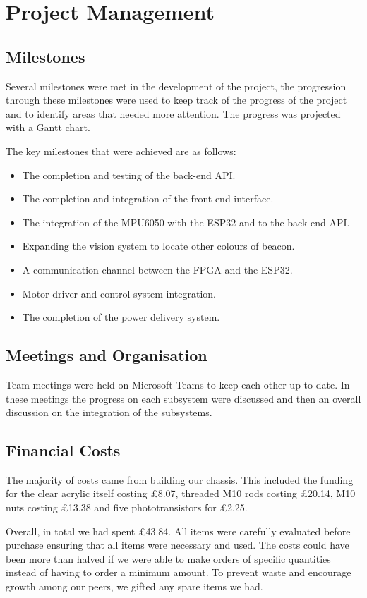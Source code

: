 \section{Project Management}

\subsection{Milestones}
Several milestones were met in the development of the project, 
the progression through these milestones were used to keep track of the progress 
of the project and to identify areas that needed more attention. 
The progress was projected with a Gantt chart.

The key milestones that were achieved are as follows:
\begin{itemize}
    \item The completion and testing of the back-end API.
    \item The completion and integration of the front-end interface.
    \item The integration of the MPU6050 with the ESP32 and to the back-end API.
    \item Expanding the vision system to locate other colours of beacon.
    \item A communication channel between the FPGA and the ESP32.
    \item Motor driver and control system integration.
    \item The completion of the power delivery system.
\end{itemize}


\subsection{Meetings and Organisation}
Team meetings were held on Microsoft Teams to keep each other up to date. 
In these meetings the progress on each subsystem were discussed 
and then an overall discussion on the integration of the subsystems.

\subsection{Financial Costs}
The majority of costs came from building our chassis. This included the funding for the clear acrylic itself costing £8.07, threaded M10 rods costing £20.14, M10 nuts costing £13.38 and five phototransistors for £2.25. 

Overall, in total we had spent £43.84. All items were carefully evaluated before purchase ensuring that all items were necessary and used. The costs could have been more than halved if we were able to make orders of specific quantities instead of having to order a minimum amount. To prevent waste and encourage growth among our peers, we gifted any spare items we had. 

